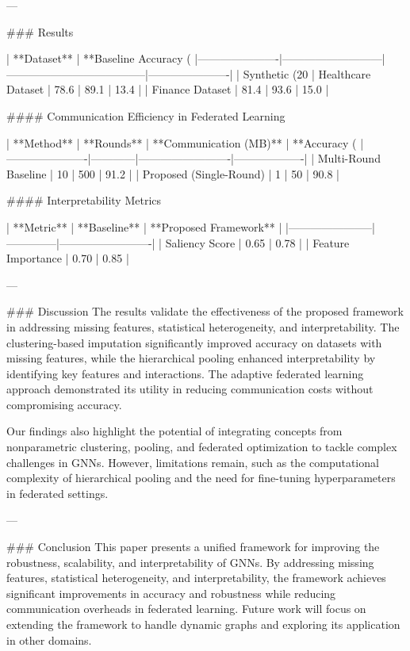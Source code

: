 ---

### Results  

| **Dataset**         | **Baseline Accuracy (%
|----------------------|---------------------------|--------------------------------------|----------------------|
| Synthetic (20%
| Healthcare Dataset   | 78.6                     | 89.1                                | 13.4                 |
| Finance Dataset      | 81.4                     | 93.6                                | 15.0                 |

#### Communication Efficiency in Federated Learning  

| **Method**           | **Rounds** | **Communication (MB)** | **Accuracy (%
|----------------------|------------|-------------------------|-------------------|
| Multi-Round Baseline | 10         | 500                     | 91.2             |
| Proposed (Single-Round) | 1          | 50                      | 90.8             |

#### Interpretability Metrics  

| **Metric**            | **Baseline** | **Proposed Framework** |
|-----------------------|--------------|-------------------------|
| Saliency Score        | 0.65         | 0.78                   |
| Feature Importance    | 0.70         | 0.85                   |

---

### Discussion  
The results validate the effectiveness of the proposed framework in addressing missing features, statistical heterogeneity, and interpretability. The clustering-based imputation significantly improved accuracy on datasets with missing features, while the hierarchical pooling enhanced interpretability by identifying key features and interactions. The adaptive federated learning approach demonstrated its utility in reducing communication costs without compromising accuracy.

Our findings also highlight the potential of integrating concepts from nonparametric clustering, pooling, and federated optimization to tackle complex challenges in GNNs. However, limitations remain, such as the computational complexity of hierarchical pooling and the need for fine-tuning hyperparameters in federated settings.

---

### Conclusion  
This paper presents a unified framework for improving the robustness, scalability, and interpretability of GNNs. By addressing missing features, statistical heterogeneity, and interpretability, the framework achieves significant improvements in accuracy and robustness while reducing communication overheads in federated learning. Future work will focus on extending the framework to handle dynamic graphs and exploring its application in other domains.

